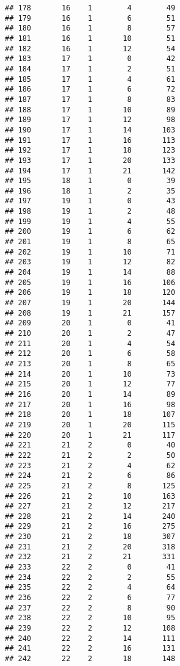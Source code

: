 \documentclass[
]{article}
\begin{document}
\begin{verbatim}
## 178       16    1        4        49
## 179       16    1        6        51
## 180       16    1        8        57
## 181       16    1       10        51
## 182       16    1       12        54
## 183       17    1        0        42
## 184       17    1        2        51
## 185       17    1        4        61
## 186       17    1        6        72
## 187       17    1        8        83
## 188       17    1       10        89
## 189       17    1       12        98
## 190       17    1       14       103
## 191       17    1       16       113
## 192       17    1       18       123
## 193       17    1       20       133
## 194       17    1       21       142
## 195       18    1        0        39
## 196       18    1        2        35
## 197       19    1        0        43
## 198       19    1        2        48
## 199       19    1        4        55
## 200       19    1        6        62
## 201       19    1        8        65
## 202       19    1       10        71
## 203       19    1       12        82
## 204       19    1       14        88
## 205       19    1       16       106
## 206       19    1       18       120
## 207       19    1       20       144
## 208       19    1       21       157
## 209       20    1        0        41
## 210       20    1        2        47
## 211       20    1        4        54
## 212       20    1        6        58
## 213       20    1        8        65
## 214       20    1       10        73
## 215       20    1       12        77
## 216       20    1       14        89
## 217       20    1       16        98
## 218       20    1       18       107
## 219       20    1       20       115
## 220       20    1       21       117
## 221       21    2        0        40
## 222       21    2        2        50
## 223       21    2        4        62
## 224       21    2        6        86
## 225       21    2        8       125
## 226       21    2       10       163
## 227       21    2       12       217
## 228       21    2       14       240
## 229       21    2       16       275
## 230       21    2       18       307
## 231       21    2       20       318
## 232       21    2       21       331
## 233       22    2        0        41
## 234       22    2        2        55
## 235       22    2        4        64
## 236       22    2        6        77
## 237       22    2        8        90
## 238       22    2       10        95
## 239       22    2       12       108
## 240       22    2       14       111
## 241       22    2       16       131
## 242       22    2       18       148

\end{verbatim}
\end{document}
